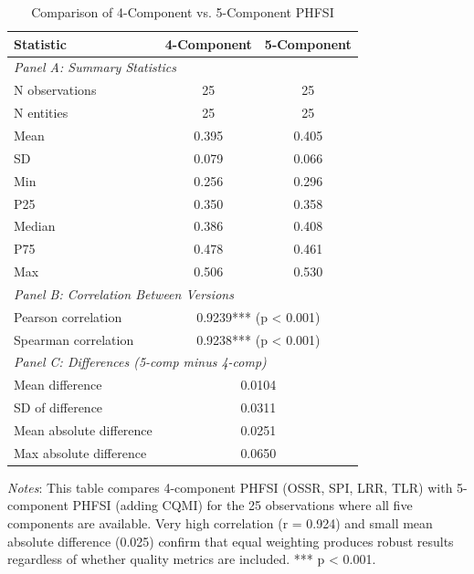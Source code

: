 \begin{table}[htbp]
\centering
\caption{Comparison of 4-Component vs. 5-Component PHFSI}
\label{tab:phfsi_4vs5_comparison}
\begin{tabular}{lcc}
\toprule
\textbf{Statistic} & \textbf{4-Component} & \textbf{5-Component} \\
\midrule
\multicolumn{3}{l}{\textit{Panel A: Summary Statistics}} \\
N observations & 25 & 25 \\
N entities & 25 & 25 \\
Mean & 0.395 & 0.405 \\
SD & 0.079 & 0.066 \\
Min & 0.256 & 0.296 \\
P25 & 0.350 & 0.358 \\
Median & 0.386 & 0.408 \\
P75 & 0.478 & 0.461 \\
Max & 0.506 & 0.530 \\
\midrule
\multicolumn{3}{l}{\textit{Panel B: Correlation Between Versions}} \\
Pearson correlation & \multicolumn{2}{c}{0.9239*** (p < 0.001)} \\
Spearman correlation & \multicolumn{2}{c}{0.9238*** (p < 0.001)} \\
\midrule
\multicolumn{3}{l}{\textit{Panel C: Differences (5-comp minus 4-comp)}} \\
Mean difference & \multicolumn{2}{c}{0.0104} \\
SD of difference & \multicolumn{2}{c}{0.0311} \\
Mean absolute difference & \multicolumn{2}{c}{0.0251} \\
Max absolute difference & \multicolumn{2}{c}{0.0650} \\
\bottomrule
\end{tabular}
\begin{tablenotes}
\footnotesize
\item \textit{Notes}: This table compares 4-component PHFSI (OSSR, SPI, LRR, TLR) with 5-component PHFSI (adding CQMI) for the 25 observations where all five components are available. Very high correlation (r = 0.924) and small mean absolute difference (0.025) confirm that equal weighting produces robust results regardless of whether quality metrics are included. *** p < 0.001.
\end{tablenotes}
\end{table}
